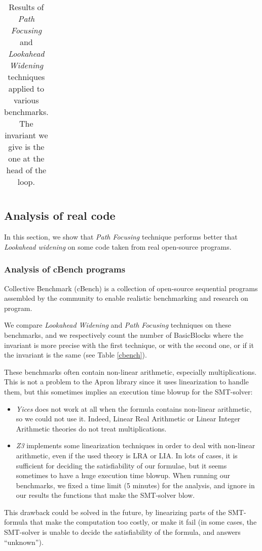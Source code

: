 \documentclass[a4paper,english,titlepage,11pt]{report}
\begin{document}
\begin{table}[!h]
\begin{tabular}{|c|c|c|l||c||c|l|}
\end{tabular}
\caption{Results of \emph{Path Focusing} and \emph{Lookahead Widening}
techniques applied to various benchmarks. The invariant we give is the one at
the head of the loop.}
\label{experiments}
\end{table}


	\subsection{Analysis of real code}

	In this section, we show that \emph{Path Focusing} technique performs better
	that \emph{Lookahead widening} on some code taken from real open-source
	programs.

	\subsubsection{Analysis of cBench programs}
	Collective Benchmark (cBench) \cite{cbench} 
	is a collection of open-source sequential
	programs assembled by the community to enable realistic
	benchmarking and research on program.

	We compare \emph{Lookahead Widening} and \emph{Path Focusing} techniques on
	these benchmarks, and we respectively count the number of BasicBlocks where
	the invariant is more precise with the first technique, or with the second
	one, or if it the invariant is the same (see Table \ref{cbench}).

	These benchmarks often contain non-linear arithmetic, especially
	multiplications. This is not a problem to the Apron library since it uses
	linearization to handle them, but this sometimes implies an execution time
	blowup for the SMT-solver:
\begin{itemize}
\item \emph{Yices} does not work at all when the formula contains non-linear
arithmetic, so we could not use it. Indeed, Linear Real Arithmetic or Linear
Integer Arithmetic theories do not treat multiplications.
\item \emph{Z3} implements some linearization techniques 
in order to deal with non-linear
arithmetic, even if the used theory is LRA or LIA. In lots of cases, it is
sufficient for deciding the satisfiability of our formulae, but it seems
sometimes to have a huge execution time blowup. 
When running our benchmarks, we fixed a time limit (5 minutes) for the analysis,
and ignore in our results the functions that make the SMT-solver blow.
\end{itemize}
	This drawback could be solved in the future, by linearizing parts of the
	SMT-formula that make the computation too costly, or make it fail (in some
	cases, the SMT-solver is unable to decide the satisfiability of the formula,
	and answers ``unknown'').
\end{document}
